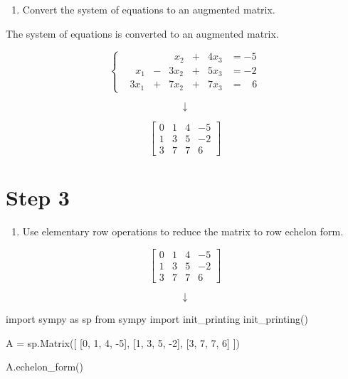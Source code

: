 \documentclass[
  letterpaper,
  DIV=11,
  numbers=noendperiod]{scrreprt}
\newenvironment{Shaded}{\begin{snugshade}}{\end{snugshade}}
\newcommand{\DecValTok}[1]{\textcolor[rgb]{0.68,0.00,0.00}{#1}}
\newcommand{\ImportTok}[1]{\textcolor[rgb]{0.00,0.46,0.62}{#1}}
\newcommand{\NormalTok}[1]{\textcolor[rgb]{0.00,0.23,0.31}{#1}}
\newcommand{\OperatorTok}[1]{\textcolor[rgb]{0.37,0.37,0.37}{#1}}
\providecommand{\tightlist}{%
  \setlength{\itemsep}{0pt}\setlength{\parskip}{0pt}}\usepackage{longtable,booktabs,array}
\begin{document}
\begin{enumerate}
\def\labelenumi{\arabic{enumi}.}
\setcounter{enumi}{1}
\tightlist
\item
  Convert the system of equations to an augmented matrix.
\end{enumerate}

The system of equations is converted to an augmented matrix.

\[
\begin{cases}
& & &\;\;x_2 &+ &4x_3 &= -5 \\
&\;\;x_1 &- &3x_2 &+ &5x_3 &= -2 \\
&3x_1 &+ &7x_2 &+ &7x_3 &= \;\;\;6
\end{cases}
\]

\[
\downarrow
\]

\[
\left[\begin{array}{ccc|c}
0 & 1 & 4 & -5 \\
1 & 3 & 5 & -2 \\
3 & 7 & 7 & 6
\end{array}\right]
\]

\chapter{Step 3}

\begin{enumerate}
\def\labelenumi{\arabic{enumi}.}
\setcounter{enumi}{2}
\tightlist
\item
  Use elementary row operations to reduce the matrix to row echelon
  form.
\end{enumerate}

\[
\left[\begin{array}{ccc|c}
0 & 1 & 4 & -5 \\
1 & 3 & 5 & -2 \\
3 & 7 & 7 & 6
\end{array}\right]
\]

\[
\downarrow
\]

\begin{Shaded}
\begin{Highlighting}[]
\ImportTok{import}\NormalTok{ sympy }\ImportTok{as}\NormalTok{ sp  }
\ImportTok{from}\NormalTok{ sympy }\ImportTok{import}\NormalTok{ init\_printing}
\NormalTok{init\_printing()}

\NormalTok{A }\OperatorTok{=}\NormalTok{ sp.Matrix([}
\NormalTok{    [}\DecValTok{0}\NormalTok{, }\DecValTok{1}\NormalTok{, }\DecValTok{4}\NormalTok{, }\OperatorTok{{-}}\DecValTok{5}\NormalTok{],}
\NormalTok{    [}\DecValTok{1}\NormalTok{, }\DecValTok{3}\NormalTok{, }\DecValTok{5}\NormalTok{, }\OperatorTok{{-}}\DecValTok{2}\NormalTok{],}
\NormalTok{    [}\DecValTok{3}\NormalTok{, }\DecValTok{7}\NormalTok{, }\DecValTok{7}\NormalTok{, }\DecValTok{6}\NormalTok{]}
\NormalTok{])}

\NormalTok{A.echelon\_form()}
\end{Highlighting}
\end{Shaded}
\end{document}
